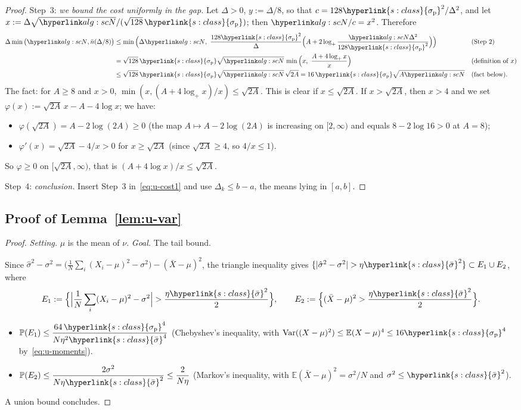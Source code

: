 \documentclass[11pt]{article}
\DeclareRobustCommand{\sy}[2]{{\hyperlink{#1}{#2}}}
\newcommand{\E}{\mathbb{E}}
\renewcommand{\P}{\mathbb{P}}
\newcommand{\1}{\mathbf{1}}
\newcommand{\sbar}{\sy{s:class}{\bar\sigma}}
\newcommand{\sigp}{\sy{s:class}{\sigma_{\mathrm p}}}
\begin{document}
\begin{proof}
Step~3: \emph{we bound the cost uniformly in the gap.} Let $\Delta>0$, $y:=\Delta/8$, so that $c=128\sigp^2/\Delta^2$, and let $x:=\Delta\sqrt\uN/(\sqrt{128}\,\sigp)$; then
$\uN/c=x^2$. Therefore
\begin{align*}
\Delta\min\big(\uN,\bar n(\Delta/8)\big)&\le\min\Big(\Delta\uN,\ \frac{128\sigp^2}\Delta\Big(A+2\log_+\frac{\uN\Delta^2}{128\sigp^2}\Big)\Big) &&\text{(Step~2)}\\
&=\sqrt{128}\,\sigp\sqrt\uN\,\min\Big(x,\ \frac{A+4\log_+x}x\Big) &&\text{(definition of $x$)}\\
&\le\sqrt{128}\,\sigp\sqrt\uN\,\sqrt{2A}=16\,\sigp\sqrt{A\uN} &&\text{(fact below)}.
\end{align*}
The fact: for $A\ge8$ and $x>0$, $\min(x,(A+4\log_+x)/x)\le\sqrt{2A}$. This is clear if $x\le\sqrt{2A}$. If $x>\sqrt{2A}$, then $x>4$ and we set
$\varphi(x):=\sqrt{2A}\,x-A-4\log x$; we have:
\begin{itemize}
\item $\varphi(\sqrt{2A})=A-2\log(2A)\ge0$ (the map $A\mapsto A-2\log(2A)$ is increasing on $[2,\infty)$ and equals $8-2\log16>0$ at $A=8$);
\item $\varphi'(x)=\sqrt{2A}-4/x>0$ for $x\ge\sqrt{2A}$ (since $\sqrt{2A}\ge4$, so $4/x\le1$).
\end{itemize}
So $\varphi\ge0$ on $[\sqrt{2A},\infty)$, that is $(A+4\log x)/x\le\sqrt{2A}$.

Step~4: \emph{conclusion.} Insert Step~3 in~\eqref{eq:u-cost1} and use $\Delta_k\le b-a$, the means lying in $[a,b]$.
\end{proof}

\subsection{Proof of Lemma~\ref{lem:u-var}}
\begin{proof}
\textit{Setting.} $\mu$ is the mean of $\nu$. \textit{Goal.} The tail bound.

Since $\hat\sigma^2-\sigma^2=\big(\frac1N\sum_i(X_i-\mu)^2-\sigma^2\big)-(\bar X-\mu)^2$, the triangle inequality gives
$\{|\hat\sigma^2-\sigma^2|>\eta\sbar^2\}\subset E_1\cup E_2$, where
\[
E_1:=\Big\{\Big|\frac1N\sum_i(X_i-\mu)^2-\sigma^2\Big|>\frac{\eta\sbar^2}2\Big\},\qquad E_2:=\Big\{(\bar X-\mu)^2>\frac{\eta\sbar^2}2\Big\}.
\]
\begin{itemize}
\item $\P(E_1)\le\dfrac{64\,\sigp^4}{N\eta^2\sbar^4}$ (Chebyshev's inequality, with $\mathrm{Var}((X-\mu)^2)\le\E(X-\mu)^4\le16\sigp^4$ by~\eqref{eq:u-moments}).
\item $\P(E_2)\le\dfrac{2\sigma^2}{N\eta\sbar^2}\le\dfrac2{N\eta}$ (Markov's inequality, with $\E(\bar X-\mu)^2=\sigma^2/N$ and $\sigma^2\le\sbar^2$).
\end{itemize}
A union bound concludes.
\end{proof}
\end{document}
